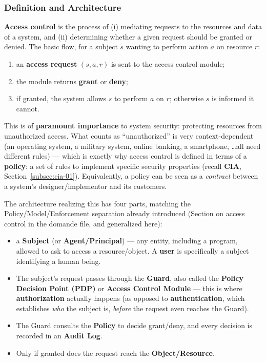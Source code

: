 \documentclass[12pt, a4paper]{article}
\begin{document}
\subsubsection{Definition and Architecture}
\label{subsec:ac-architecture-08}
\textbf{Access control} is the process of (i) mediating requests to the resources and data of a system, and (ii) determining whether a given request should be granted or denied. The basic flow, for a subject $s$ wanting to perform action $a$ on resource $r$:
\begin{enumerate}
    \item an \textbf{access request} $(s,a,r)$ is sent to the access control module;
    \item the module returns \textbf{grant} or \textbf{deny};
    \item if granted, the system allows $s$ to perform $a$ on $r$; otherwise $s$ is informed it cannot.
\end{enumerate}
This is of \textbf{paramount importance} to system security: protecting resources from unauthorized access. What counts as ``unauthorized'' is very context-dependent (an operating system, a military system, online banking, a smartphone, \dots all need different rules) --- which is exactly why access control is defined in terms of a \textbf{policy}: a set of rules to implement specific security properties (recall \textbf{CIA}, Section~\ref{subsec:cia-01}). Equivalently, a policy can be seen as a \emph{contract} between a system's designer/implementor and its customers.

The architecture realizing this has four parts, matching the Policy/Model/Enforcement separation already introduced (Section on access control in the domande file, and generalized here):
\begin{itemize}
    \item a \textbf{Subject} (or \textbf{Agent/Principal}) --- any entity, including a program, allowed to ask to access a resource/object. A \textbf{user} is specifically a subject identifying a human being.
    \item The subject's request passes through the \textbf{Guard}, also called the \textbf{Policy Decision Point (PDP)} or \textbf{Access Control Module} --- this is where \textbf{authorization} actually happens (as opposed to \textbf{authentication}, which establishes \emph{who} the subject is, \emph{before} the request even reaches the Guard).
    \item The Guard consults the \textbf{Policy} to decide grant/deny, and every decision is recorded in an \textbf{Audit Log}.
    \item Only if granted does the request reach the \textbf{Object/Resource}.
\end{itemize}
\end{document}
